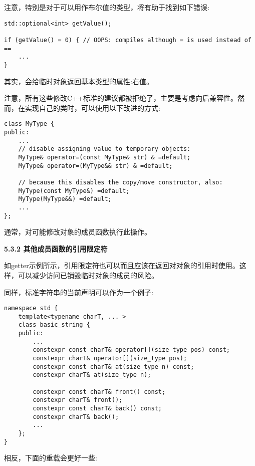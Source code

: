 注意，特别是对于可以用作布尔值的类型，将有助于找到如下错误:\par

\begin{lstlisting}[caption={}]
std::optional<int> getValue();

if (getValue() = 0) { // OOPS: compiles although = is used instead of ==
	...
}
\end{lstlisting}

其实，会给临时对象返回基本类型的属性:右值。\par

注意，所有这些修改C++标准的建议都被拒绝了，主要是考虑向后兼容性。然而，在实现自己的类时，可以使用以下改进的方式:\par

\begin{lstlisting}[caption={}]
class MyType {
public:
	...
	// disable assigning value to temporary objects:
	MyType& operator=(const MyType& str) & =default;
	MyType& operator=(MyType&& str) & =default;
	
	// because this disables the copy/move constructor, also:
	MyType(const MyType&) =default;
	MyType(MyType&&) =default;
	...
};
\end{lstlisting}

通常，对可能修改对象的成员函数执行此操作。\par

\hspace*{\fill} \par %
\textbf{5.3.2 其他成员函数的引用限定符}

如getter示例所示，引用限定符也可以而且应该在返回对对象的引用时使用。这样，可以减少访问已销毁临时对象的成员的风险。\par

同样，标准字符串的当前声明可以作为一个例子:\par

\begin{lstlisting}[caption={}]
namespace std {
	template<typename charT, ... >
	class basic_string {
	public:
		...
		constexpr const charT& operator[](size_type pos) const;
		constexpr charT& operator[](size_type pos);
		constexpr const charT& at(size_type n) const;
		constexpr charT& at(size_type n);
		
		constexpr const charT& front() const;
		constexpr charT& front();
		constexpr const charT& back() const;
		constexpr charT& back();
		...
	};
}
\end{lstlisting}

相反，下面的重载会更好一些:\par


